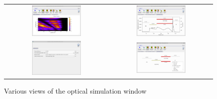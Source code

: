 \begin{figure}[H]
\centering
\begin{tabular}{ c c }

\includegraphics[width=0.5\textwidth,height=0.4\textwidth]{./images/transfer_matrix/opticalsimulation.png}

&
\includegraphics[width=0.5\textwidth,height=0.4\textwidth]{./images/transfer_matrix/opticalsimulation1.png}

\\
\includegraphics[width=0.5\textwidth,height=0.4\textwidth]{./images/transfer_matrix/opticalsimulation2.png}

&
\includegraphics[width=0.5\textwidth,height=0.4\textwidth]{./images/transfer_matrix/opticalsimulation3.png}

\\
\end{tabular}
\caption{Various views of the optical simulation window}
\label{fig:transfermatrix1}
\end{figure}

